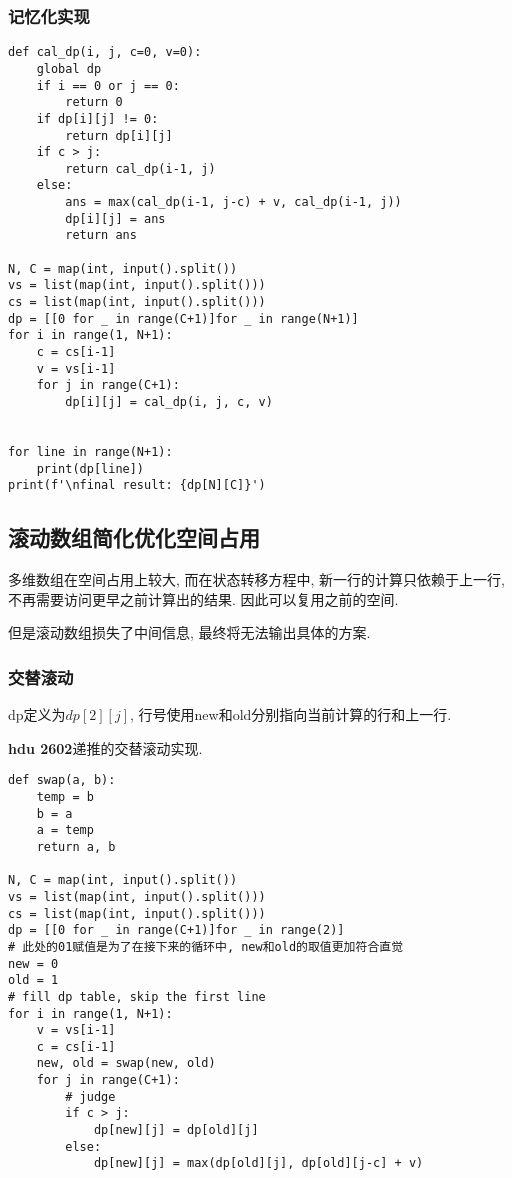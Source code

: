 \documentclass[../main]{subfiles}
\begin{document}
\begin{sloppy}
\subsubsection{记忆化实现}

\begin{lstlisting}[style = Python]
def cal_dp(i, j, c=0, v=0):
    global dp
    if i == 0 or j == 0:
        return 0
    if dp[i][j] != 0:
        return dp[i][j]
    if c > j:
        return cal_dp(i-1, j)
    else:
        ans = max(cal_dp(i-1, j-c) + v, cal_dp(i-1, j))
        dp[i][j] = ans
        return ans

N, C = map(int, input().split())
vs = list(map(int, input().split()))
cs = list(map(int, input().split())) 
dp = [[0 for _ in range(C+1)]for _ in range(N+1)]
for i in range(1, N+1):
    c = cs[i-1]
    v = vs[i-1]
    for j in range(C+1):
        dp[i][j] = cal_dp(i, j, c, v)


for line in range(N+1):
    print(dp[line])
print(f'\nfinal result: {dp[N][C]}')
\end{lstlisting}

\subsection{滚动数组简化优化空间占用}

多维数组在空间占用上较大, 而在状态转移方程中, 新一行的计算只依赖于上一行, 不再需要访问更早之前计算出的结果. 因此可以复用之前的空间.

但是滚动数组损失了中间信息, 最终将无法输出具体的方案.

\subsubsection{交替滚动}

dp定义为$dp[2][j]$, 行号使用new和old分别指向当前计算的行和上一行.

\textbf{hdu 2602}递推的交替滚动实现.

\begin{lstlisting}[style = Python]
def swap(a, b):
    temp = b
    b = a
    a = temp
    return a, b

N, C = map(int, input().split())
vs = list(map(int, input().split()))
cs = list(map(int, input().split())) 
dp = [[0 for _ in range(C+1)]for _ in range(2)]
# 此处的01赋值是为了在接下来的循环中, new和old的取值更加符合直觉
new = 0
old = 1
# fill dp table, skip the first line
for i in range(1, N+1):
    v = vs[i-1]
    c = cs[i-1]
    new, old = swap(new, old)
    for j in range(C+1):
        # judge 
        if c > j:
            dp[new][j] = dp[old][j]
        else:
            dp[new][j] = max(dp[old][j], dp[old][j-c] + v)


\end{lstlisting}
\end{sloppy}
\end{document}
